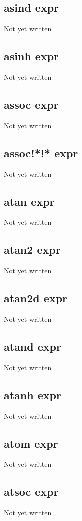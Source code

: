 \documentclass[a4paper,11pt]{article}
\begin{document}
\subsection{\ttfamily asind expr}
Not yet written

\subsection{\ttfamily asinh expr}
Not yet written

\subsection{\ttfamily assoc expr}
Not yet written

\subsection{\ttfamily assoc!*!* expr}
Not yet written

\subsection{\ttfamily atan expr}
Not yet written

\subsection{\ttfamily atan2 expr}
Not yet written

\subsection{\ttfamily atan2d expr}
Not yet written

\subsection{\ttfamily atand expr}
Not yet written

\subsection{\ttfamily atanh expr}
Not yet written

\subsection{\ttfamily atom expr}
Not yet written

\subsection{\ttfamily atsoc expr}
Not yet written
\end{document}
